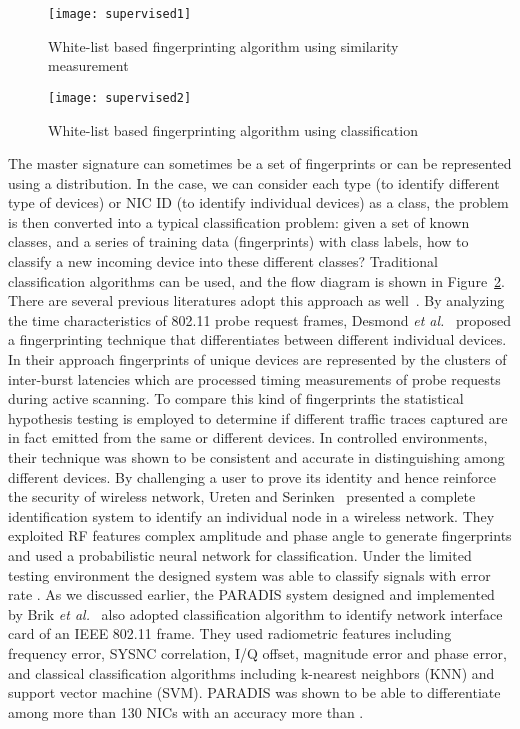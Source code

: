 \documentclass[journal,draftcls,onecolumn,11pt]{IEEEtran}
\begin{document}
\begin{figure}[ht!]
\centering
\texttt{[image: supervised1]}
\caption{White-list based fingerprinting algorithm using similarity measurement}
\label{supervised1}
\end{figure}

\begin{figure}[ht!]
\centering
\texttt{[image: supervised2]}
\caption{White-list based fingerprinting algorithm using classification}
\label{supervised2}
\end{figure}

The master signature can sometimes be a set of fingerprints or can be represented using a distribution. In the case, we can consider each type (to identify different type of devices) or NIC ID (to identify individual devices) as a class, the problem is then converted into a typical classification problem: given a set of known classes, and a series of training data (fingerprints) with class labels, how to classify a new incoming device into these different classes? Traditional classification algorithms can be used, and the flow diagram is shown in Figure~\ref{supervised2}. There are several previous literatures adopt this approach as well~\cite{Bratus2008,Ureten2007,Brik2008,Scanlon2010,Hall2005}. By analyzing the time characteristics of 802.11 probe request frames, Desmond \textit{et al.}~\cite{Desmond2008} proposed a fingerprinting technique that differentiates between different individual devices. In their approach fingerprints of unique devices are represented by the clusters of inter-burst latencies which are processed timing measurements of probe requests during active scanning. To compare this kind of fingerprints the statistical hypothesis testing is employed to determine if different traffic traces captured are in fact emitted from the same or different devices.  In controlled environments, their technique was shown to be consistent and accurate in distinguishing among different devices. By challenging a user to prove its identity and hence reinforce the security of wireless network, Ureten and Serinken~\cite{Ureten2007} presented a complete identification system to identify an individual node in a wireless network. They exploited RF features complex amplitude and phase angle to generate fingerprints and used a probabilistic neural network for classification. Under the limited testing environment the designed system was able to classify signals with error rate . As we discussed earlier, the PARADIS system designed and implemented by Brik \textit{et al.}~\cite{Brik2008} also adopted classification algorithm to identify network interface card of an IEEE 802.11 frame. They used radiometric features including frequency error, SYSNC correlation, I/Q offset, magnitude error and phase error, and classical classification algorithms including k-nearest neighbors (KNN) and support vector machine (SVM). PARADIS was shown to be able to differentiate among more than 130 NICs with an accuracy more than .
\end{document}
